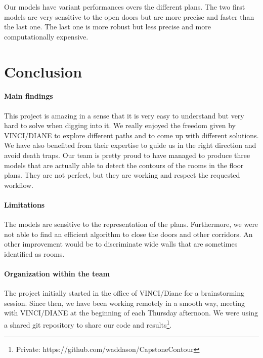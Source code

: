 \documentclass[11pt]{article}
\begin{document}
Our models have variant performances overs the different plans. The two
first models are very sensitive to the open doors but are more precise and 
faster than the last one. The last one is more robust but less precise and
more computationally expensive.

\section{Conclusion}
\paragraph{Main findings}
This project is amazing in a sense that it is very easy to understand but very hard
to solve when digging into it. We really enjoyed the freedom given by VINCI/DIANE
to explore different paths and to come up with different solutions. We have
also benefited from their expertise to guide us in the right direction and avoid
death traps. 
Our team is pretty proud to have managed to produce three models that are actually able to
detect the contours of the rooms in the floor plans. They are not perfect, but
they are working and respect the requested workflow.

\paragraph{Limitations}
The models are sensitive to the representation of the plans. Furthermore, we 
were not able to find an efficient algorithm to close the doors and other corridors.
An other improvement would be to discriminate wide walls that are sometimes 
identified as rooms.

\paragraph{Organization within the team}
The project initially started in the office of VINCI/Diane for a brainstorming session.
Since then, we have been working remotely in a smooth way, meeting with 
VINCI/DIANE at the beginning of each Thursday afternoon. We were using a shared 
git repository to share our code and results\footnote{Private: https://github.com/waddason/CapstoneContour}.
\end{document}
